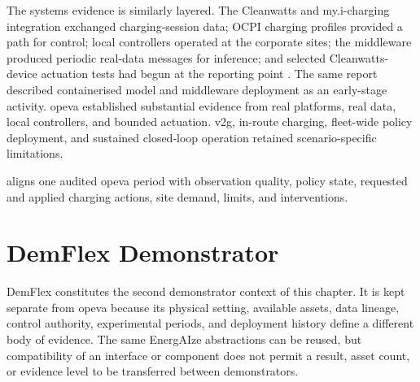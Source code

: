 The systems evidence is similarly layered. The Cleanwatts and my.i-charging integration exchanged charging-session data; OCPI charging profiles provided a path for control; local controllers operated at the corporate sites; the middleware produced periodic real-data messages for inference; and selected Cleanwatts-device actuation tests had begun at the reporting point \parencite{opeva2026d63}. The same report described containerised model and middleware deployment as an early-stage activity. \gls{opeva} established substantial evidence from real platforms, real data, local controllers, and bounded actuation. \gls{v2g}, in-route charging, fleet-wide policy deployment, and sustained closed-loop operation retained scenario-specific limitations.

 aligns one audited \gls{opeva} period with observation quality, policy state, requested and applied charging actions, site demand, limits, and interventions.


\section{DemFlex Demonstrator}
\label{sec:demflex-demonstrator}

DemFlex constitutes the second demonstrator context of this chapter. It is kept separate from \gls{opeva} because its physical setting, available assets, data lineage, control authority, experimental periods, and deployment history define a different body of evidence. The same EnergAIze abstractions can be reused, but compatibility of an interface or component does not permit a result, asset count, or evidence level to be transferred between demonstrators.



